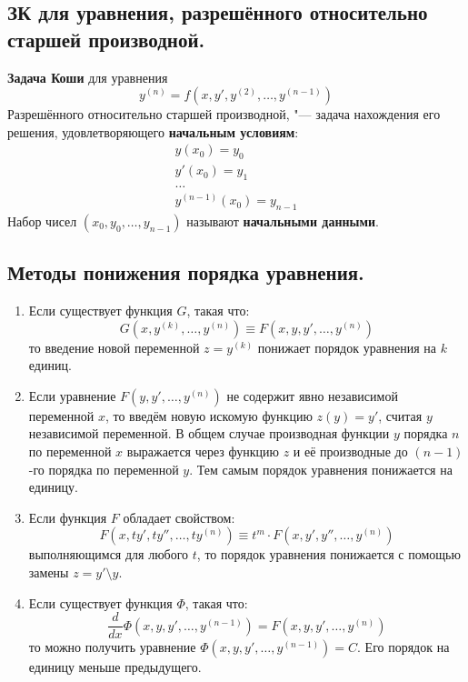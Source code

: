\documentclass{article}
\begin{document}
\subsection{ЗК для уравнения, разрешённого относительно старшей производной.}
\textbf{Задача Коши} для уравнения
\begin{equation*}
    y^{(n)} = f(x, y', y^{(2)}, \ldots, y^{(n-1)})
\end{equation*}
Разрешённого относительно старшей производной, "--- задача нахождения его решения, удовлетворяющего \textbf{начальным условиям}:
\begin{gather*}
    y(x_0) = y_0\\
    y'(x_0) = y_1\\
    \ldots\\
    y^{(n - 1)}(x_0) = y_{n-1}
\end{gather*}
Набор чисел $(x_0, y_0, \ldots, y_{n-1})$ называют \textbf{начальными данными}.

\subsection{Методы понижения порядка уравнения.}
\begin{enumerate}
    \item Если существует функция $G$, такая что: 
    \begin{equation*}
        G(x, y^{(k)}, \ldots, y^{(n)}) \equiv F(x, y, y', \ldots, y^{(n)})
    \end{equation*}
    то введение новой переменной $z = y^{(k)}$ понижает порядок уравнения на $k$ единиц.
    \item Если уравнение $F(y, y', \ldots, y^{(n)})$ не содержит явно независимой переменной $x$, то введём новую искомую функцию $z(y) = y'$, считая $y$ независимой переменной. В общем случае производная функции $y$ порядка $n$ по переменной $x$ выражается через функцию $z$ и её производные до $(n − 1)$-го порядка по переменной $y$. Тем самым порядок уравнения понижается на единицу.
    \item Если функция $F$ обладает свойством:
    \begin{equation*}
        F(x, ty', ty'', \ldots, ty^{(n)}) \equiv t^m\cdot F(x, y', y'', \ldots, y^{(n)})
    \end{equation*}
    выполняющимся для любого $t$, то порядок уравнения понижается с помощью замены $z =y'\setminus y$.
    \item Если существует функция $\varPhi$, такая что:
    \begin{equation*}
        \frac{d}{dx} \varPhi(x, y, y', \ldots, y^{(n-1)}) = F(x, y, y', \ldots, y^{(n)})
    \end{equation*}
    то можно получить уравнение $\varPhi(x, y, y', \ldots, y^{(n-1)}) = C$. Его порядок на единицу меньше предыдущего.
\end{enumerate}
\end{document}
